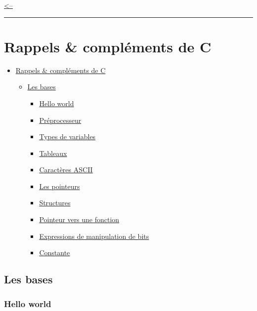 \href{../README.md}{\textless--}

\begin{center}\rule{0.5\linewidth}{0.5pt}\end{center}

\section{Rappels \& compléments de C}\label{rappels-compluxe9ments-de-c}

\begin{itemize}
\tightlist
\item
  \hyperref[rappels--compluxe9ments-de-c]{Rappels \& compléments de C}

  \begin{itemize}
  \tightlist
  \item
    \hyperref[les-bases]{Les bases}

    \begin{itemize}
    \tightlist
    \item
      \hyperref[hello-world]{Hello world}
    \item
      \hyperref[pruxe9processeur]{Préprocesseur}
    \item
      \hyperref[types-de-variables]{Types de variables}
    \item
      \hyperref[tableaux]{Tableaux}
    \item
      \hyperref[caractuxe8res-ascii]{Caractères ASCII}
    \item
      \hyperref[les-pointeurs]{Les pointeurs}
    \item
      \hyperref[structures]{Structures}
    \item
      \hyperref[pointeur-vers-une-fonction]{Pointeur vers une fonction}
    \item
      \hyperref[expressions-de-manipulation-de-bits]{Expressions de
      manipulation de bits}
    \item
      \hyperref[constante]{Constante}
    \end{itemize}
  \end{itemize}
\end{itemize}

\subsection{Les bases}\label{les-bases}

\subsubsection{Hello world}\label{hello-world}

